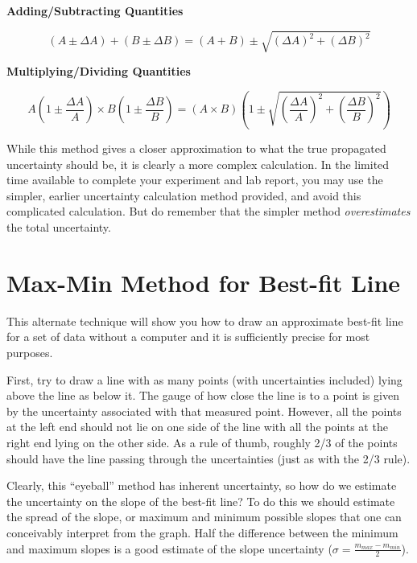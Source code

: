 \documentclass[letterpaper, 12pt]{book}
\newcommand{\myskip}{\vspace{0.5\baselineskip}}
\begin{document}
\textbf{Adding/Subtracting Quantities}

\begin{equation}
    (A\pm\Delta A) + (B\pm\Delta B) = (A+B)\pm\sqrt{(\Delta A)^2+(\Delta B)^2}
\end{equation}

\myskip\textbf{Multiplying/Dividing Quantities}

\begin{equation}
    A\left(1\pm\frac{\Delta A}{A}\right) \times B\left(1\pm\frac{\Delta B}{B}\right) = \left(A \times B\right) \left ( 1 \pm\sqrt{\left(\frac{\Delta A}{A}\right)^2+\left(\frac{\Delta B}{B}\right)^2} \right )
\end{equation}

While this method gives a closer approximation to what the true propagated uncertainty should be, it is clearly a more complex calculation.  In the limited time available to complete your experiment and lab report, you may use the simpler, earlier uncertainty calculation method provided, and avoid this complicated calculation.  But do remember that the simpler method \emph{overestimates} the total uncertainty.

\section{Max-Min Method for Best-fit Line}

This alternate technique will show you how to draw an approximate best-fit line for a  set of data without a computer and it is sufficiently precise for most purposes.

First, try to draw a line with as many points (with uncertainties included) lying above the line as below it. The gauge of how close the line is to a point is given by the uncertainty associated with that measured point. However, all the points at the left end should not lie on one side of the line with all the points at the right end lying on the other side. As a rule of thumb, roughly 2/3 of the points should have the line passing through the uncertainties (just as with the 2/3 rule).\myskip

Clearly, this ``eyeball'' method has inherent uncertainty, so how do we estimate the uncertainty on the slope of the best-fit line? To do this we should estimate the spread of the slope, or maximum and minimum possible slopes that one can conceivably interpret from the graph. Half the difference between the minimum and maximum slopes is a good estimate of the slope uncertainty ($\sigma=\frac{m_{max}-m_{min}}{2}$).
\end{document}
